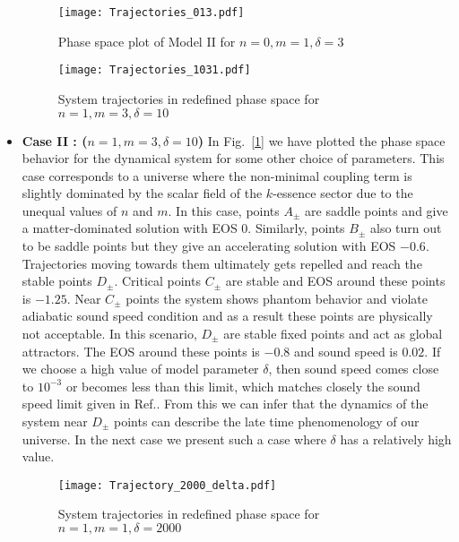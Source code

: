 \documentclass[a4paper,12pt]{article}
\begin{document}
\begin{itemize}
\begin{figure}[t!]
\begin{minipage}[b]{0.5\linewidth}
\centering
\texttt{[image: Trajectories\_013.pdf]} 
\caption{Phase space plot of Model II for $n=0, m=1,  \delta = 3$ } 
\label{fig:M2a1}
\end{minipage}
\hspace{0.2cm}
\begin{minipage}[b]{0.5\linewidth}
\centering
\texttt{[image: Trajectories\_1031.pdf]}
\caption{System trajectories in redefined phase space for $n=1,  m=3, \delta = 10$}
\label{fig:M2b1}
\end{minipage}
\end{figure}
\item {\textbf{{Case II : ($n=1,  m=3, \delta = 10$)}}}\; In Fig.~[\ref{fig:M2b1}] we have plotted the phase space behavior for the dynamical system for some other choice of parameters. This case corresponds to a universe where the non-minimal coupling term is slightly dominated by the scalar field of the $k$-essence sector due to the unequal values of $n$ and $m$. In this case, points $A_{\pm}$ are saddle points and give a matter-dominated solution with EOS $0$. Similarly, points $B_{\pm}$ also turn out to be saddle points but they give an accelerating solution with EOS $-0.6$.  Trajectories moving towards them ultimately gets repelled and reach the stable points $D_\pm$. Critical points $C_{\pm}$ are stable and EOS around these points is $-1.25$.  Near $C_{\pm}$ points the system shows phantom  behavior and violate adiabatic sound speed condition and as a result  these points are physically not acceptable. In this scenario, $D_{\pm}$ are stable fixed points and act as global attractors. The EOS around these points is $-0.8$ and sound speed is $0.02$. If we choose a high value of model parameter $\delta$, then sound speed comes close to $10^{-3}$ or becomes less than this limit, which matches closely the sound speed limit given in Ref.\cite{Kumar:2019gfl}. From this we can infer that the dynamics of the system near $D_{\pm}$ points can describe the late time phenomenology of our universe. In the next case we present such a case where $\delta$ has a relatively high value.

\begin{figure}[t!]
	\centering
	\texttt{[image: Trajectory\_2000\_delta.pdf]}
	\caption{System trajectories in redefined phase space for $n=1,  m=1, \delta = 2000$}
	\label{fig:M2c1}
\end{figure}


\end{itemize}
\end{document}
